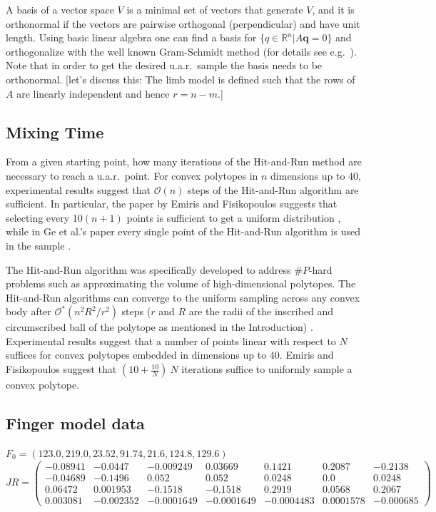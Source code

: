 \documentclass[10pt,letterpaper]{article}
\begin{document}
A basis of a vector space $V$ is a minimal set of vectors that generate $V$, and it is orthonormal if the vectors are pairwise orthogonal (perpendicular) and have unit length. Using basic linear algebra one can find a basis for $\{q \in \mathbb{R}^n | A\textbf{q} = 0\}$ and orthogonalize with the well known Gram-Schmidt method (for details see e.g.\ \cite{Robertson}). Note that in order to get the desired u.a.r.\ sample the basis needs to be orthonormal. [let's discuss this: The limb model is defined such that the rows of $A$ are linearly independent and hence $r=n-m$.]

\subsection*{Mixing Time}
\label{sec_lengthrun}
From a given starting point, how many iterations of the Hit-and-Run method are necessary to reach a u.a.r.\ point.
For convex polytopes in $n$ dimensions up to $40$, experimental results suggest that $\mathcal{O}(n)$ steps of the Hit-and-Run algorithm are sufficient.
In particular, the paper \cite{emiris2013efficient} by Emiris and Fisikopoulos suggests that selecting every $10(n + 1)$ points is sufficient to get a uniform distribution \cite{emiris2013efficient}, while in Ge et al.'s paper every single point of the Hit-and-Run algorithm is used in the sample \cite{Ge}.


The Hit-and-Run algorithm was specifically developed to address $\#P$-hard problems such as approximating the volume of high-dimensional polytopes\cite{Dyer}. The Hit-and-Run algorithms can converge to the uniform sampling across any convex body \cite{smith1984efficient} after $\mathcal{O}^*(n^2R^2/r^2)$ steps ($r$ and $R$ are the radii of the inscribed and circumscribed ball of the polytope as mentioned in the Introduction) \cite{Dyer, Lovasz}.  Experimental results  suggest that a number of points linear with respect to $N$  suffices for convex polytopes embedded in dimensions up to 40.  Emiris and Fisikopoulos \cite{emiris2013efficient} suggest that  $(10 + \frac{10}{N})~N$ iterations suffice to uniformly sample a convex polytope.





\subsection{Finger model data}
$F_0 = (123.0, 219.0, 23.52, 91.74,	21.6, 124.8, 129.6)$\\
$
JR = 
\begin{pmatrix}
-0.08941 & -0.0447 & -0.009249 & 0.03669 & 0.1421 & 0.2087 & -0.2138 \\
-0.04689 & -0.1496 & 0.052 &0.052 & 0.0248 & 0.0 & 0.0248 \\ 
0.06472 & 0.001953 & -0.1518 &-0.1518 & 0.2919 & 0.0568 & 0.2067 \\
0.003081 & -0.002352 & -0.0001649 & -0.0001649 & -0.0004483 & 0.0001578 & -0.000685
\end{pmatrix}$
\end{document}
